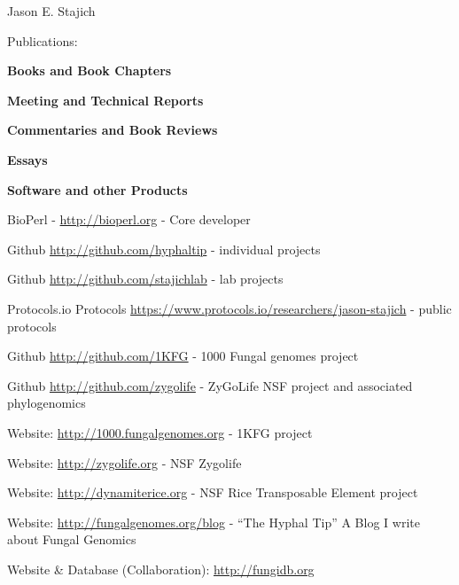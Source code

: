 \documentclass[10pt]{article}
\begin{document}
\begin{cv}{\centerline{Jason E. Stajich}}
\begin{cvlist}{Publications:}
\item \textbf{Books and Book Chapters}


\item \textbf{Meeting and Technical Reports}


\item \textbf{Commentaries and Book Reviews}


\item \textbf{Essays}

\begin{cvlistcompact}{\bf Software and other Products}
  \item BioPerl - \url{http://bioperl.org} - Core developer
\item Github \url{http://github.com/hyphaltip} - individual
  projects
\item Github \url{http://github.com/stajichlab} - lab
  projects
 \item Protocols.io Protocols \url{https://www.protocols.io/researchers/jason-stajich} - public protocols
 \item Github \url{http://github.com/1KFG} - 1000 Fungal
   genomes project
\item Github \url{http://github.com/zygolife} - ZyGoLife NSF project
  and associated phylogenomics
\item Website: \url{http://1000.fungalgenomes.org} - 1KFG project
\item Website: \url{http://zygolife.org} - NSF Zygolife
\item Website: \url{http://dynamiterice.org} - NSF Rice Transposable
    Element project
\item Website: \url{http://fungalgenomes.org/blog} - ``The Hyphal
  Tip'' A Blog I write about Fungal Genomics
\item Website \& Database (Collaboration): \url{http://fungidb.org}
\end{cvlistcompact}



\end{cvlist}
\end{cv}
\end{document}
